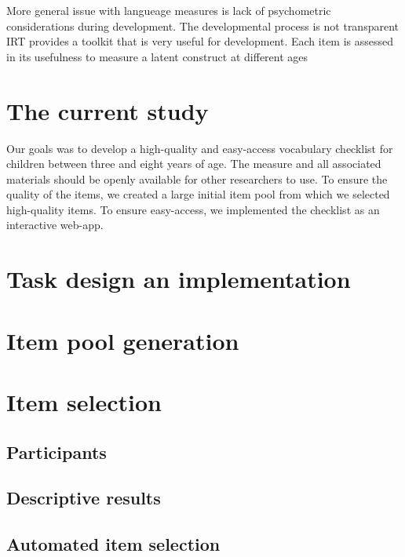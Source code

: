 \documentclass[
  man,floatsintext]{apa6}
\begin{document}
More general issue with langueage measures is lack of psychometric considerations during development. The developmental process is not transparent IRT provides a toolkit that is very useful for development. Each item is assessed in its usefulness to measure a latent construct at different ages

\hypertarget{the-current-study}{%
\section{The current study}\label{the-current-study}}

Our goals was to develop a high-quality and easy-access vocabulary checklist for children between three and eight years of age. The measure and all associated materials should be openly available for other researchers to use. To ensure the quality of the items, we created a large initial item pool from which we selected high-quality items. To ensure easy-access, we implemented the checklist as an interactive web-app.

\hypertarget{task-design-an-implementation}{%
\section{Task design an implementation}\label{task-design-an-implementation}}

\hypertarget{item-pool-generation}{%
\section{Item pool generation}\label{item-pool-generation}}

\hypertarget{item-selection}{%
\section{Item selection}\label{item-selection}}

\hypertarget{participants}{%
\subsection{Participants}\label{participants}}

\hypertarget{descriptive-results}{%
\subsection{Descriptive results}\label{descriptive-results}}

\hypertarget{automated-item-selection}{%
\subsection{Automated item selection}\label{automated-item-selection}}
\end{document}
